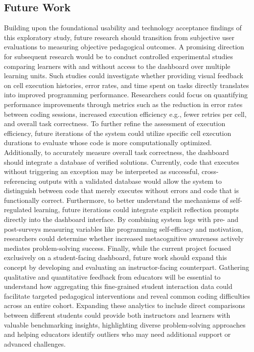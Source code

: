 \subsection{Future Work}
Building upon the foundational usability and technology acceptance findings of this exploratory study, future research should transition from subjective user evaluations to measuring objective pedagogical outcomes. A promising direction for subsequent research would be to conduct controlled experimental studies comparing learners with and without access to the dashboard over multiple learning units. Such studies could investigate whether providing visual feedback on cell execution histories, error rates, and time spent on tasks directly translates into improved programming performance. Researchers could focus on quantifying performance improvements through metrics such as the reduction in error rates between coding sessions, increased execution efficiency e.g., fewer retries per cell, and overall task correctness. To further refine the assessment of execution efficiency, future iterations of the system could utilize specific cell execution durations to evaluate whose code is more computationally optimized. Additionally, to accurately measure overall task correctness, the dashboard should integrate a database of verified solutions. Currently, code that executes without triggering an exception may be interpreted as successful, cross-referencing outputs with a validated database would allow the system to distinguish between code that merely executes without errors and code that is functionally correct.
Furthermore, to better understand the mechanisms of self-regulated learning, future iterations could integrate explicit reflection prompts directly into the dashboard interface. By combining system logs with pre- and post-surveys measuring variables like programming self-efficacy and motivation, researchers could determine whether increased metacognitive awareness actively mediates problem-solving success. 
Finally, while the current project focused exclusively on a student-facing dashboard, future work should expand this concept by developing and evaluating an instructor-facing counterpart. Gathering qualitative and quantitative feedback from educators will be essential to understand how aggregating this fine-grained student interaction data could facilitate targeted pedagogical interventions and reveal common coding difficulties across an entire cohort. Expanding these analytics to include direct comparisons between different students could provide both instructors and learners with valuable benchmarking insights, highlighting diverse problem-solving approaches and helping educators identify outliers who may need additional support or advanced challenges.